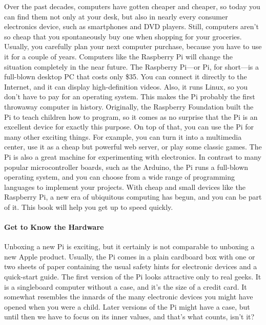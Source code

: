 Over the past decades, computers have gotten cheaper and cheaper, so today
you can find them not only at your desk, but also in nearly every consumer
electronics device, such as smartphones and DVD players. Still, computers
aren’t so cheap that you spontaneously buy one when shopping for your
groceries. Usually, you carefully plan your next computer purchase, because
you have to use it for a couple of years.\vspace{5mm}
Computers like the Raspberry Pi will change the situation completely in the
near future. The Raspberry Pi—or Pi, for short—is a full-blown desktop PC
that costs only \$35. You can connect it directly to the Internet, and it can
display high-definition videos. Also, it runs Linux, so you don’t have to pay
for an operating system. This makes the Pi probably the first throwaway
computer in history.\vspace{5mm}
Originally, the Raspberry Foundation built the Pi to teach children how to
program, so it comes as no surprise that the Pi is an excellent device for
exactly this purpose. On top of that, you can use the Pi for many other
exciting things. For example, you can turn it into a multimedia center, use
it as a cheap but powerful web server, or play some classic games.
The Pi is also a great machine for experimenting with electronics. In contrast
to many popular microcontroller boards, such as the Arduino, the Pi runs a
full-blown operating system, and you can choose from a wide range of programming
languages to implement your projects.\vspace{5mm}
With cheap and small devices like the Raspberry Pi, a new era of ubiquitous
computing has begun, and you can be part of it. This book will help you get
up to speed quickly.\vspace{5mm}


\paragraph{Get to Know the Hardware}
Unboxing a new Pi is exciting, but it certainly is not comparable to unboxing
a new Apple product. Usually, the Pi comes in a plain cardboard box with
one or two sheets of paper containing the usual safety hints for electronic
devices and a quick-start guide.
The first version of the Pi looks attractive only to real geeks. It is a singleboard
computer without a case, and it’s the size of a credit card. It somewhat
resembles the innards of the many electronic devices you might have opened
when you were a child. Later versions of the Pi might have a case, but until
then we have to focus on its inner values, and that’s what counts, isn’t it?

